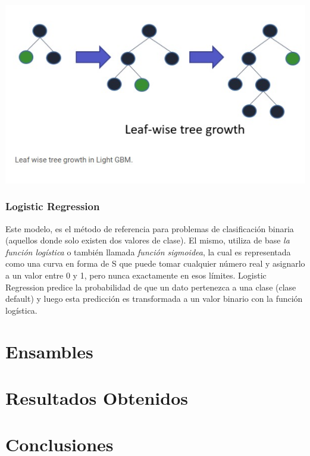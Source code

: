 \documentclass[12pt,a4paper]{article}
\begin{document}
\begin{center}
    \includegraphics[scale=0.5]{imgs/lightgbm.jpeg}
\end{center}

\subsubsection{Logistic Regression}
Este modelo, es el método de referencia para problemas de clasificación binaria (aquellos donde solo existen dos valores de clase). El mismo, utiliza de base \textit{la función logística} o también llamada \textit{función sigmoidea}, la cual es representada como una curva en forma de S que puede tomar cualquier número real y asignarlo a un valor entre 0 y 1, pero nunca exactamente en esos límites. Logistic Regression predice la probabilidad de que un dato pertenezca a una clase (clase default) y luego esta predicción es transformada a un valor binario con la función logística. 
\section{Ensambles}
\section{Resultados Obtenidos}
\section{Conclusiones}
\end{document}
